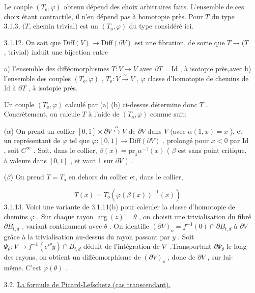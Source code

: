 Le couple $(T_o, \varphi)$ obtenu dépend des choix arbitraires faits. L'ensemble de ces choix étant contractile, il n'en dépend pas à homotopie près. Pour $T$ du type 3.1.3, $(T$, chemin trivial$)$ est un $(T_o, \varphi)$ du type considéré ici.

3.1.12. On sait que $\mathrm{Diff}(V) \longrightarrow \mathrm{Diff}(\partial V)$ est une fibration, de sorte que $T \longrightarrow (T$ , trivial$)$ induit une bijection entre

a) l'ensemble des difféomorphismes $T : V \longrightarrow V$ avec $\partial T = \mathrm{Id}$ , à isotopie près,avec
b) l'ensemble des couples $(T_o, \varphi)$ , $T_o : V \stackrel{\sim}{\longrightarrow} V$ , $\varphi$ classe d'homotopie de chemins de $\mathrm{Id}$ à $\partial T$ , à isotopie près.

Un couple $(T_o, \varphi)$ calculé par (a) (b) ci-dessus détermine donc $T$ . Concrètement, on calcule $T$ à l'aide de $(T_o, \varphi)$ comme suit:

($\alpha$) On prend un collier $[0, 1] \times \partial V \stackrel{\alpha}{\hookrightarrow} V$ de $\partial V$ dans $V$ (avec $\alpha(1, x) = x$ ), et un représentant de $\varphi$ tel que $\varphi : [0, 1] \longrightarrow \mathrm{Diff}(\partial V)$ , prolongé pour $x < 0$ par $\mathrm{Id}$ , soit $C^{\infty}$ . Soit, dans le collier, $\beta(x) = \mathrm{pr}_1 \alpha^{-1}(x)$ ( $\beta$ est sans point critique, à valeurs dans $[0, 1]$ , et vaut 1 sur $\partial V$ ) .

($\beta$) On prend $T = T_o$ en dehors du collier et, dans le collier,

\begin{equation*}
T(x) = T_o(\varphi(\beta(x))^{-1}(x))
\end{equation*}
3.1.13. Voici une variante de 3.1.11(b) pour calculer la classe d'homotopie de chemins $\varphi$ . Sur chaque rayon $\arg(z) = \theta$ , on choisit une trivialisation du fibré $\partial B_{t,d}$ , variant continument avec $\theta$ . On identifie $(\partial V)_o = f^{-1}(0) \cap \partial B_{t,d}$ à $\partial V$ grâce à la trivialisation au-dessus du rayon passant par $y$ . Soit $\Psi_{\theta} : V \longrightarrow f^{-1}(e^{i\theta} y) \cap B_{t,d}$ déduit de l'intégration de $\nabla$ .Transportant $\partial \Psi_{\theta}$ le long des rayons, on obtient un difféomorphisme de $(\partial V)_o$ , donc de $\partial V$ , sur lui-même. C'est $\varphi(\theta)$ .


3.2. \underline{La formule de Picard-Lefschetz (cas transcendant).}

